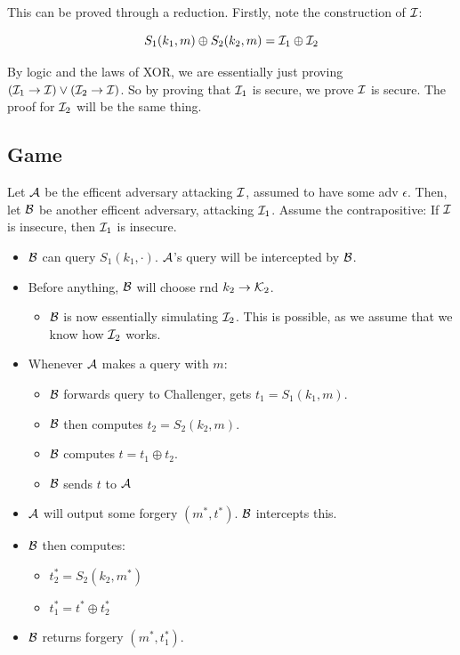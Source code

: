 \documentclass[12pt]{article}
\begin{document}
\begin{solution}
This can be proved through a reduction. Firstly, note the construction of $\mathcal{I}$:

\begin{equation*}
    S_1(k_1, m) \oplus S_2(k_2, m) = \mathcal{I}_1 \oplus \mathcal{I}_2
\end{equation*}

\noindent By logic and the laws of XOR, we are essentially just proving $(\mathcal{I}_1 \rightarrow \mathcal{I}) \lor (\mathcal{I}_2 \rightarrow \mathcal{I})$. So by proving that $\mathcal{I}_1$ is secure, we prove $\mathcal{I}$ is secure.
The proof for $\mathcal{I}_2$ will be the same thing.

\subsection*{Game}
Let $\mathcal{A}$ be the efficent adversary attacking $\mathcal{I}$, assumed to have some adv $\epsilon$. Then, let $\mathcal{B}$ be another efficent adversary, attacking $\mathcal{I}_1$.
Assume the contrapositive: If $\mathcal{I}$ is insecure, then $\mathcal{I}_1$ is insecure.

\begin{itemize}
    \item $\mathcal{B}$ can query $S_1(k_1, \cdot)$. $\mathcal{A}$'s query will be intercepted by $\mathcal{B}$.
    \item Before anything, $\mathcal{B}$ will choose rnd $k_2 \to \mathcal{K}_2$.
    \begin{itemize}
        \item $\mathcal{B}$ is now essentially simulating $\mathcal{I}_2$. This is possible, as we assume that we know how $\mathcal{I}_2$ works.
    \end{itemize}
    \item Whenever $\mathcal{A}$ makes a query with $m$:
    \begin{itemize}
        \item $\mathcal{B}$ forwards query to Challenger, gets $t_1 = S_1(k_1, m)$.
        \item $\mathcal{B}$ then computes $t_2 = S_2(k_2, m)$.
        \item $\mathcal{B}$ computes $t = t_1 \oplus t_2$.
        \item $\mathcal{B}$ sends $t$ to $\mathcal{A}$
    \end{itemize}
    \item $\mathcal{A}$ will output some forgery $(m^*, t^*)$. $\mathcal{B}$ intercepts this.
    \item $\mathcal{B}$ then computes:
    \begin{itemize}
        \item $t^*_2 = S_2(k_2, m^*)$
        \item $t^*_1 = t^* \oplus t^*_2$
    \end{itemize}
    \item $\mathcal{B}$ returns forgery $(m^*, t^*_1)$.
\end{itemize}


\end{solution}
\end{document}
